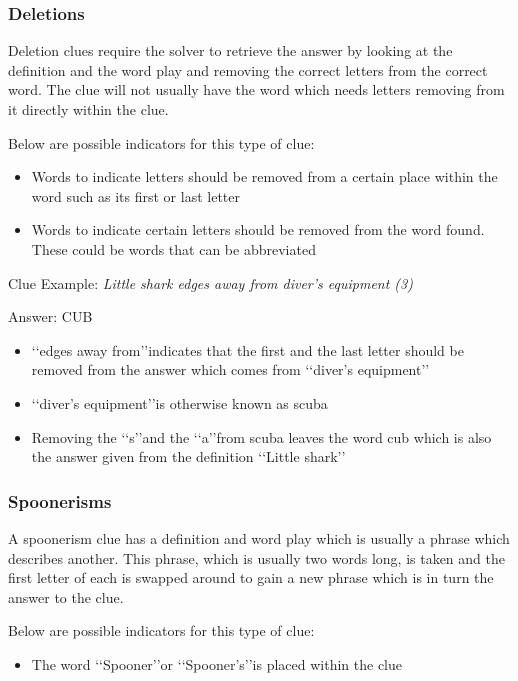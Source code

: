 \subsubsection{Deletions}

Deletion clues require the solver to retrieve the answer by looking at the definition and the word play and removing the correct letters from the correct word. The clue will not usually have the word which needs letters removing from it directly within the clue.  

Below are possible indicators for this type of clue:
\begin{itemize}
 	\item Words to indicate letters should be removed from a certain place within the word such as its first or last letter 
	\item Words to indicate certain letters should be removed from the word found. These could be words that can be abbreviated 
\\
\end{itemize}

Clue Example: \emph{Little shark edges away from diver's equipment (3)}  

Answer: CUB 

\begin{itemize}
	\item \lq\lq edges away from\rq\rq indicates that the first and the last letter should be removed from the answer which comes from \lq\lq diver’s equipment\rq\rq
	\item \lq\lq diver’s equipment\rq\rq is otherwise known as scuba  
	\item Removing the \lq\lq s\rq\rq and the \lq\lq a\rq\rq from scuba leaves the word cub which is also the answer given from the definition \lq\lq Little shark\rq\rq
\end{itemize}

\subsubsection{Spoonerisms}

A spoonerism clue has a definition and word play which is usually a phrase which describes another. This phrase, which is usually two words long, is taken and the first letter of each is swapped around to gain a new phrase which is in turn the answer to the clue.  

Below are possible indicators for this type of clue:
\begin{itemize} 
	\item The word \lq\lq Spooner\rq\rq or \lq\lq Spooner’s\rq\rq is placed within the clue
\\ 
\end{itemize}


